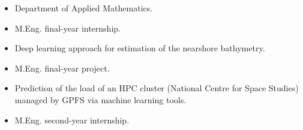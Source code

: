 \documentclass[10pt,a4paper,academicons]{altacv}
\begin{document}
\begin{itemize}
    \item Department of Applied Mathematics.
    \item M.Eng. final-year internship.
\end{itemize}

\divider

\begin{itemize}
    \item Deep learning approach for estimation of the nearshore bathymetry.
    \item M.Eng. final-year project.
\end{itemize}

\divider

\begin{itemize}
    \item Prediction of the load of an HPC cluster (National Centre for Space Studies) managed by GPFS via machine learning tools.
    \item M.Eng. second-year internship.
\end{itemize}
\end{document}
